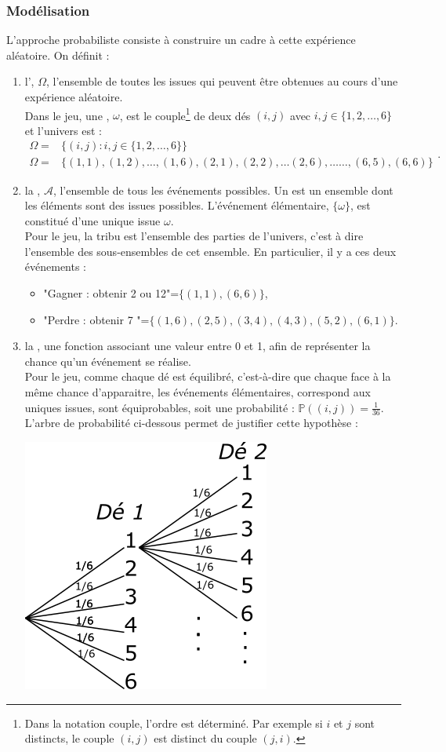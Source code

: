 \documentclass{book}
\begin{document}
\subsubsection*{Modélisation } L'approche probabiliste consiste à construire un cadre à  cette expérience aléatoire. On définit :
\begin{enumerate}
\item l', $\Omega$, l'ensemble de toutes les issues qui peuvent être obtenues au cours d'une expérience aléatoire.\\ 
Dans le jeu, une , $\omega$, est le couple\footnote{Dans la notation couple, l'ordre est déterminé. Par exemple si $i$ et $j$ sont distincts, le couple $(i, j)$ est distinct du couple $(j, i)$.} de deux dés $(i,j)$ avec $i,j\in\{1,2,\dots,6\}$ et l'univers est : 
\[
\begin{array}{rl}
\Omega=&      \{(i,j): i,j\in\{1,2,\dots,6\}  \}\\
\Omega=&\{(1,1),(1,2),\dots, (1,6),(2,1),(2,2),\dots (2,6),\dots\dots, (6,5),(6,6)\}
\end{array}.
\]
\item  la , $\mathcal{A}$, l'ensemble de tous les événements possibles. Un  est un ensemble dont les éléments sont des issues possibles. L'événement élémentaire, $\{\omega\}$, est constitué d'une unique issue $\omega$.\\
Pour le jeu, la tribu est l'ensemble des parties de l'univers, c'est à dire  l'ensemble des sous-ensembles de cet ensemble. En particulier, il y a ces deux événements :
\begin{itemize}
\item "Gagner : obtenir 2 ou 12"=$\{(1,1),(6,6)\}$,
\item "Perdre : obtenir 7 "=$\{(1,6),(2,5),(3,4),(4,3),(5,2),(6,1)\}$.
\end{itemize} 
\item la ,  une fonction  associant une valeur entre 0 et 1, afin de représenter la chance qu'un événement se réalise.\\
Pour le jeu, comme chaque dé est équilibré, c'est-à-dire que chaque face à la même chance d'apparaitre, les événements élémentaires, correspond aux uniques issues, sont équiprobables,   soit une probabilité : $\mathbb{P}((i,j))=\frac{1}{36} $.  L'arbre de probabilité ci-dessous permet de justifier cette hypothèse : 
\begin{center}
\includegraphics[scale=0.5]{arbre.png}

\end{center}
\end{enumerate}
\end{document}
